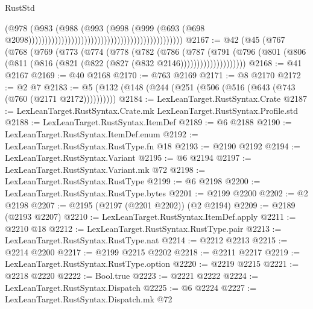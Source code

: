\begin{lexlean}{RustStd}
\begin{coremodule}
                                                                                  (@978
                                                                                    (@983
                                                                                      (@988
                                                                                        (@993
                                                                                          (@998
                                                                                            (@999
                                                                                              (@693
                                                                                                (@698
                                                                                                  @2098)))))))))))))))))))))))))))))))))))))))))))))))
@2167 := @42
    (@45
      (@767
        (@768
          (@769
            (@773
              (@774
                (@778
                  (@782
                    (@786
                      (@787
                        (@791
                          (@796
                            (@801
                              (@806 (@811 (@816 (@821 (@822 (@827 (@832 @2146))))))))))))))))))))
@2168 := @41 @2167
@2169 := @40 @2168
@2170 := @763 @2169
@2171 := @8 @2170
@2172 := @2 @7
@2183 := @5 (@132 (@148 (@244 (@251 (@506 (@516 (@643 (@743 (@760 (@2171 @2172))))))))))
@2184 := LexLeanTarget.RustSyntax.Crate
@2187 := LexLeanTarget.RustSyntax.Crate.mk LexLeanTarget.RustSyntax.Profile.std
@2188 := LexLeanTarget.RustSyntax.ItemDef
@2189 := @6 @2188
@2190 := LexLeanTarget.RustSyntax.ItemDef.enum
@2192 := LexLeanTarget.RustSyntax.RustType.fn @18
@2193 := @2190 @2192
@2194 := LexLeanTarget.RustSyntax.Variant
@2195 := @6 @2194
@2197 := LexLeanTarget.RustSyntax.Variant.mk @72
@2198 := LexLeanTarget.RustSyntax.RustType
@2199 := @6 @2198
@2200 := LexLeanTarget.RustSyntax.RustType.bytes
@2201 := @2199 @2200
@2202 := @2 @2198
@2207 := @2195 (@2197 (@2201 @2202)) (@2 @2194)
@2209 := @2189 (@2193 @2207)
@2210 := LexLeanTarget.RustSyntax.ItemDef.apply
@2211 := @2210 @18
@2212 := LexLeanTarget.RustSyntax.RustType.pair
@2213 := LexLeanTarget.RustSyntax.RustType.nat
@2214 := @2212 @2213
@2215 := @2214 @2200
@2217 := @2199 @2215 @2202
@2218 := @2211 @2217
@2219 := LexLeanTarget.RustSyntax.RustType.option
@2220 := @2219 @2215
@2221 := @2218 @2220
@2222 := Bool.true
@2223 := @2221 @2222
@2224 := LexLeanTarget.RustSyntax.Dispatch
@2225 := @6 @2224
@2227 := LexLeanTarget.RustSyntax.Dispatch.mk @72

\end{coremodule}
\end{lexlean}

